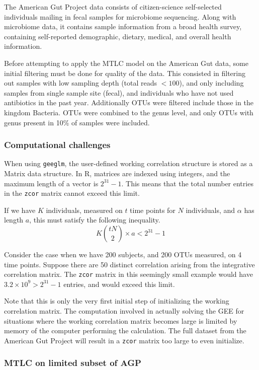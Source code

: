 \documentclass[12pt]{article}
\begin{document}
The American Gut Project data consists of citizen-science self-selected individuals mailing in fecal samples for microbiome sequencing. Along with microbiome data, it contains sample information from a broad health survey, containing self-reported demographic, dietary, medical, and overall health information.

Before attempting to apply the MTLC model on the American Gut data, some initial filtering must be done for quality of the data. This consisted in filtering out samples with low sampling depth (total reads $< 100$), and only including samples from single sample site (fecal), and individuals who have not used antibiotics in the past year. Additionally OTUs were filtered include those in the kingdom Bacteria. OTUs were combined to the genus level, and only OTUs with genus present in 10\% of samples were included.

\subsubsection{Computational challenges}

When using \texttt{geeglm}, the user-defined working correlation structure is stored as a Matrix data structure. In R, matrices are indexed using integers, and the maximum length of a vector is $2^{31}-1$. This means that the total number entries in the \texttt{zcor} matrix cannot exceed this limit.

If we have $K$ individuals, measured on $t$ time points for $N$ individuals, and $\alpha$ has length $a$, this must satisfy the following inequality.
$$ K \binom{tN}{2} \times a < 2^{31}-1$$

Consider the case when we have 200 subjects, and 200 OTUs measured, on 4 time points. Suppose there are 50 distinct correlation arising from the integrative correlation matrix. The \texttt{zcor} matrix in this seemingly small example would have $3.2 \times 10^9 > 2^{31}-1$ entries, and would exceed this limit.

Note that this is only the very first initial step of initializing the working correlation matrix. The computation involved in actually solving the GEE for situations where the working correlation matrix becomes large is limited by memory of the computer performing the calculation. The full dataset from the American Gut Project will result in a \texttt{zcor} matrix too large to even initialize.


\subsubsection{MTLC on limited subset of AGP}
\end{document}
